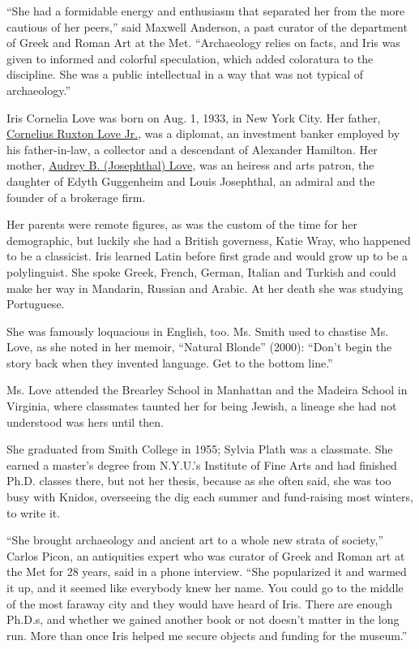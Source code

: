 ``She had a formidable energy and enthusiasm that separated her from the
more cautious of her peers,'' said Maxwell Anderson, a past curator of
the department of Greek and Roman Art at the Met. ``Archaeology relies
on facts, and Iris was given to informed and colorful speculation, which
added coloratura to the discipline. She was a public intellectual in a
way that was not typical of archaeology.''

Iris Cornelia Love was born on Aug. 1, 1933, in New York City. Her
father,
\href{https://www.nytimes3xbfgragh.onion/1971/09/07/archives/c-ruxton-love-jr-of-stock-exchange.html}{Cornelius
Ruxton Love Jr.}, was a diplomat, an investment banker employed by his
father-in-law, a collector and a descendant of Alexander Hamilton. Her
mother,
\href{https://www.nytimes3xbfgragh.onion/2003/11/27/nyregion/audrey-b-love-100-a-patron-of-the-arts.html}{Audrey
B. (Josephthal) Love}, was an heiress and arts patron, the daughter of
Edyth Guggenheim and Louis Josephthal, an admiral and the founder of a
brokerage firm.

Her parents were remote figures, as was the custom of the time for her
demographic, but luckily she had a British governess, Katie Wray, who
happened to be a classicist. Iris learned Latin before first grade and
would grow up to be a polylinguist. She spoke Greek, French, German,
Italian and Turkish and could make her way in Mandarin, Russian and
Arabic. At her death she was studying Portuguese.

She was famously loquacious in English, too. Ms. Smith used to chastise
Ms. Love, as she noted in her memoir, ``Natural Blonde'' (2000): ``Don't
begin the story back when they invented language. Get to the bottom
line.''

Ms. Love attended the Brearley School in Manhattan and the Madeira
School in Virginia, where classmates taunted her for being Jewish, a
lineage she had not understood was hers until then.

She graduated from Smith College in 1955; Sylvia Plath was a classmate.
She earned a master's degree from N.Y.U.'s Institute of Fine Arts and
had finished Ph.D. classes there, but not her thesis, because as she
often said, she was too busy with Knidos, overseeing the dig each summer
and fund-raising most winters, to write it.

``She brought archaeology and ancient art to a whole new strata of
society,'' Carlos Picon, an antiquities expert who was curator of Greek
and Roman art at the Met for 28 years, said in a phone interview. ``She
popularized it and warmed it up, and it seemed like everybody knew her
name. You could go to the middle of the most faraway city and they would
have heard of Iris. There are enough Ph.D.s, and whether we gained
another book or not doesn't matter in the long run. More than once Iris
helped me secure objects and funding for the museum.''

